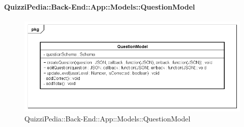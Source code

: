 \paragraph{QuizziPedia::Back-End::App::Models::QuestionModel}
\label{QuizziPedia::Back-End::App::Models::QuestionModel}
\begin{figure}
	\centering
	\includegraphics[scale=0.45]{UML/Package/QuizziPedia_Back-End_App_Models_questionModel.png}
	\caption{QuizziPedia::Back-End::App::Models::QuestionModel}
\end{figure}
